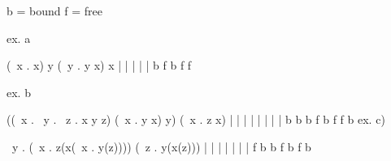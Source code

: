 b = bound
f = free

ex. a

(\ x . x) y (\ y . y x) x
       |  |        | |  | 
       b  f        b f  f
         
ex. b

((\ x . \ y . \ z .  x y z) (\ x .  y x) y) (\ x . z x)
                     | | |          | |  |         | |
                     b b b          f b  f         f b
ex. c)

\ y . (\ x . z(x(\ x . y(z)))) (\ z . y(x(z)))
             | |       | |            | | |
             f b       b f            b f b